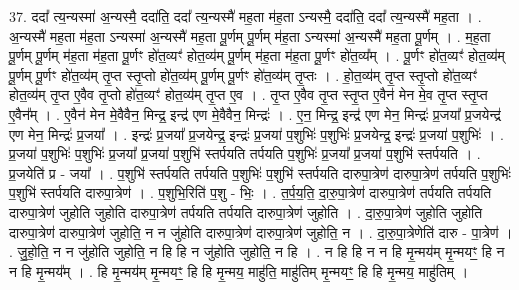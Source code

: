 \documentclass[17pt]{extarticle}
\begin{document}
37. ददा᳚ त्य॒न्यस्मा॑ अ॒न्यस्मै॒ ददा॑ति॒ ददा᳚ त्य॒न्यस्मै॑ मह॒ता म॑ह॒ता ऽन्यस्मै॒ ददा॑ति॒ ददा᳚ त्य॒न्यस्मै॑ मह॒ता । . अ॒न्यस्मै॑ मह॒ता म॑ह॒ता ऽन्यस्मा॑ अ॒न्यस्मै॑ मह॒ता पू॒र्णम् पू॒र्णम् म॑ह॒ता ऽन्यस्मा॑ अ॒न्यस्मै॑ मह॒ता पू॒र्णम् । . म॒ह॒ता पू॒र्णम् पू॒र्णम् म॑ह॒ता म॑ह॒ता पू॒र्णꣳ हो॑त॒व्यꣳ॑ होत॒व्य॑म् पू॒र्णम् म॑ह॒ता म॑ह॒ता पू॒र्णꣳ हो॑त॒व्य᳚म् । . पू॒र्णꣳ हो॑त॒व्यꣳ॑ होत॒व्य॑म् पू॒र्णम् पू॒र्णꣳ हो॑त॒व्य॑म् तृ॒प्त स्तृ॒प्तो हो॑त॒व्य॑म् पू॒र्णम् पू॒र्णꣳ हो॑त॒व्य॑म् तृ॒प्तः । . हो॒त॒व्य॑म् तृ॒प्त स्तृ॒प्तो हो॑त॒व्यꣳ॑ होत॒व्य॑म् तृ॒प्त ए॒वैव तृ॒प्तो हो॑त॒व्यꣳ॑ होत॒व्य॑म् तृ॒प्त ए॒व । . तृ॒प्त ए॒वैव तृ॒प्त स्तृ॒प्त ए॒वैन॑ मेन मे॒व तृ॒प्त स्तृ॒प्त ए॒वैन᳚म् । . ए॒वैन॑ मेन मे॒वैवैन॒ मिन्द्र॒ इन्द्र॑ एण मे॒वैवैन॒ मिन्द्रः॑ । . ए॒न॒ मिन्द्र॒ इन्द्र॑ एण मेन॒ मिन्द्रः॑ प्र॒जया᳚ प्र॒जयेन्द्र॑ एण मेन॒ मिन्द्रः॑ प्र॒जया᳚ । . इन्द्रः॑ प्र॒जया᳚ प्र॒जयेन्द्र॒ इन्द्रः॑ प्र॒जया॑ प॒शुभिः॑ प॒शुभिः॑ प्र॒जयेन्द्र॒ इन्द्रः॑ प्र॒जया॑ प॒शुभिः॑ । . प्र॒जया॑ प॒शुभिः॑ प॒शुभिः॑ प्र॒जया᳚ प्र॒जया॑ प॒शुभि॑ स्तर्पयति तर्पयति प॒शुभिः॑ प्र॒जया᳚ प्र॒जया॑ प॒शुभि॑ स्तर्पयति । . प्र॒जयेति॑ प्र - जया᳚ । . प॒शुभि॑ स्तर्पयति तर्पयति प॒शुभिः॑ प॒शुभि॑ स्तर्पयति दारुपा॒त्रेण॑ दारुपा॒त्रेण॑ तर्पयति प॒शुभिः॑ प॒शुभि॑ स्तर्पयति दारुपा॒त्रेण॑ । . प॒शुभि॒रिति॑ प॒शु - भिः॒ । . त॒र्प॒य॒ति॒ दा॒रु॒पा॒त्रेण॑ दारुपा॒त्रेण॑ तर्पयति तर्पयति दारुपा॒त्रेण॑ जुहोति जुहोति दारुपा॒त्रेण॑ तर्पयति तर्पयति दारुपा॒त्रेण॑ जुहोति । . दा॒रु॒पा॒त्रेण॑ जुहोति जुहोति दारुपा॒त्रेण॑ दारुपा॒त्रेण॑ जुहोति॒ न न जु॑होति दारुपा॒त्रेण॑ दारुपा॒त्रेण॑ जुहोति॒ न । . दा॒रु॒पा॒त्रेणेति॑ दारु - पा॒त्रेण॑ । . जु॒हो॒ति॒ न न जु॑होति जुहोति॒ न हि हि न जु॑होति जुहोति॒ न हि । . न हि हि न न हि मृ॒न्मय॑म् मृ॒न्मयꣳ॒॒ हि न न हि मृ॒न्मय᳚म् । . हि मृ॒न्मय॑म् मृ॒न्मयꣳ॒॒ हि हि मृ॒न्मय॒ माहु॑ति॒ माहु॑तिम् मृ॒न्मयꣳ॒॒ हि हि मृ॒न्मय॒ माहु॑तिम् । \newline
\end{document}
